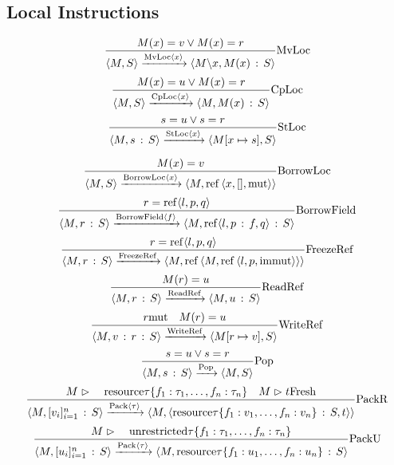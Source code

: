 \documentclass{article}
\newcommand{\colons}{\,:\,}
\newcommand{\tmop}[1]{\ensuremath{\operatorname{#1}}}
\newcommand{\tmstrong}[1]{\textbf{#1}}
\newcommand{\tmxspace}{\hspace{1em}}
\begin{document}
\subsection{Local Instructions}

\[ \frac{M (x) = v \vee M (x) = r}{\langle M, S \rangle
   \xrightarrow{\tmop{MvLoc} \langle x \rangle} \langle M\backslash x, M (x)
   \colons S \rangle}  \tmstrong{\tmop{MvLoc}} \]
\[ \frac{M (x) = u \vee M (x) = r}{\langle M, S \rangle
   \xrightarrow{\tmop{CpLoc} \langle x \rangle} \langle M, M (x) \colons S
   \rangle}  \tmstrong{\tmop{CpLoc}} \]
\[ \frac{s = u \vee s = r}{\langle M, s \colons S \rangle
   \xrightarrow{\tmop{StLoc} \langle x \rangle} \langle M [x \mapsto s], S
   \rangle}  \tmstrong{\tmop{StLoc}} \]

\[ \frac{M (x) = v}{\langle M, S \rangle \xrightarrow{\tmop{BorrowLoc} \langle
   x \rangle} \left\langle M, \tmstrong{\tmop{ref}}  \left\langle x, [],
   \tmstrong{\tmop{mut}} \right\rangle \right\rangle} 
   \tmstrong{\tmop{BorrowLoc}} \]
\[ \frac{r = \tmstrong{\tmop{ref}} \langle l, p, q \rangle}{\langle M, r
   \colons S \rangle \xrightarrow{\tmop{BorrowField} \langle f \rangle}
   \left\langle M, \tmstrong{\tmop{ref}}  \langle l, p \colons f, q \rangle
   \colons S \right\rangle}  \tmstrong{\tmop{BorrowField}} \]
\[ \frac{r = \tmstrong{\tmop{ref}}  \langle l, p, q \rangle}{\langle M, r
   \colons S \rangle \xrightarrow{\tmop{FreezeRef}} \left\langle M,
   \tmstrong{\tmop{ref}}  \left\langle M, \tmstrong{\tmop{ref}}  \left\langle
   l, p, \tmstrong{\tmop{immut}} \right\rangle \right\rangle \right\rangle} 
   \tmstrong{\tmop{FreezeRef}} \]
\[ \frac{M (r) = u}{\langle M, r \colons S \rangle
   \xrightarrow{\tmop{ReadRef}} \langle M, u \colons S \rangle} 
   \tmstrong{\tmop{ReadRef}} \]
\[ \frac{r \tmstrong{\tmop{mut}} \quad M (r) = u}{\langle M, v \colons r
   \colons S \rangle \xrightarrow{\tmop{WriteRef}} \langle M [r \mapsto v], S
   \rangle}  \tmstrong{\tmop{WriteRef}} \]
\[ \frac{s = u \vee s = r}{\langle M, s \colons S \rangle
   \xrightarrow{\tmop{Pop}} \langle M, S \rangle}  \tmstrong{\tmop{Pop}} \]
\[ \frac{M \vartriangleright \tmxspace \tmstrong{\tmop{resource}} \tau \{ f_1
   : \tau_1, \ldots, f_n : \tau_n \} \quad M \vartriangleright t
   \tmstrong{\tmop{Fresh}}}{\langle M, [v_i]^n_{i = 1} \colons S \rangle
   \xrightarrow{\tmop{Pack} \langle \tau \rangle} \left\langle M, \left\langle
   \tmstrong{\tmop{resource}} \tau \{ f_1 : v_1, \ldots, f_n : v_n \} \colons
   S, t \right\rangle \right\rangle}  \tmstrong{\tmop{PackR}} \]
\[ \frac{M \vartriangleright \tmxspace \tmstrong{\tmop{unrestricted}} \tau \{
   f_1 : \tau_1, \ldots, f_n : \tau_n \}}{\langle M, [u_i]^n_{i = 1} \colons S
   \rangle \xrightarrow{\tmop{Pack} \langle \tau \rangle} \left\langle M,
   \tmstrong{\tmop{resource}} \tau \{ f_1 : u_1, \ldots, f_n : u_n \} \colons
   S \right\rangle}  \tmstrong{\tmop{PackU}} \]
\end{document}

